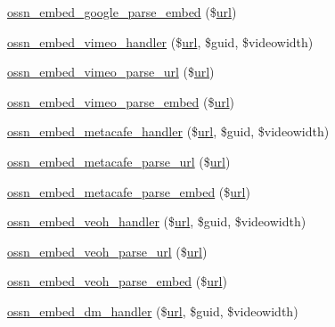 \begin{DoxyCompactItemize}
\item 
\hyperlink{ossnembed_8lib_8php_aeb01a444edbb772711eea067d8bf6939}{ossn\+\_\+embed\+\_\+google\+\_\+parse\+\_\+embed} (\$\hyperlink{ossn_8config_8site_8example_8php_ad643c3db2725019ef8130393d549e6db}{url})
\item 
\hyperlink{ossnembed_8lib_8php_aa3eb85f39f713da68aa602158e7ae611}{ossn\+\_\+embed\+\_\+vimeo\+\_\+handler} (\$\hyperlink{ossn_8config_8site_8example_8php_ad643c3db2725019ef8130393d549e6db}{url}, \$guid, \$videowidth)
\item 
\hyperlink{ossnembed_8lib_8php_a58b7d0260439c0130c7f1f0e47d8352f}{ossn\+\_\+embed\+\_\+vimeo\+\_\+parse\+\_\+url} (\$\hyperlink{ossn_8config_8site_8example_8php_ad643c3db2725019ef8130393d549e6db}{url})
\item 
\hyperlink{ossnembed_8lib_8php_a493e8e41d53bf3cfad10e16cdb5119aa}{ossn\+\_\+embed\+\_\+vimeo\+\_\+parse\+\_\+embed} (\$\hyperlink{ossn_8config_8site_8example_8php_ad643c3db2725019ef8130393d549e6db}{url})
\item 
\hyperlink{ossnembed_8lib_8php_a989f8dd3b45bd2816122693dc977fdc3}{ossn\+\_\+embed\+\_\+metacafe\+\_\+handler} (\$\hyperlink{ossn_8config_8site_8example_8php_ad643c3db2725019ef8130393d549e6db}{url}, \$guid, \$videowidth)
\item 
\hyperlink{ossnembed_8lib_8php_af2eb07a80872daa269ae0b6ff7eb1187}{ossn\+\_\+embed\+\_\+metacafe\+\_\+parse\+\_\+url} (\$\hyperlink{ossn_8config_8site_8example_8php_ad643c3db2725019ef8130393d549e6db}{url})
\item 
\hyperlink{ossnembed_8lib_8php_ab5338bb07c34b5fc693b7f73dbd5a61e}{ossn\+\_\+embed\+\_\+metacafe\+\_\+parse\+\_\+embed} (\$\hyperlink{ossn_8config_8site_8example_8php_ad643c3db2725019ef8130393d549e6db}{url})
\item 
\hyperlink{ossnembed_8lib_8php_ad2a14929285fb63afb575bce1f8139d1}{ossn\+\_\+embed\+\_\+veoh\+\_\+handler} (\$\hyperlink{ossn_8config_8site_8example_8php_ad643c3db2725019ef8130393d549e6db}{url}, \$guid, \$videowidth)
\item 
\hyperlink{ossnembed_8lib_8php_a172b3bb36e82fb10936594b86fe957b6}{ossn\+\_\+embed\+\_\+veoh\+\_\+parse\+\_\+url} (\$\hyperlink{ossn_8config_8site_8example_8php_ad643c3db2725019ef8130393d549e6db}{url})
\item 
\hyperlink{ossnembed_8lib_8php_ad1ae48c9cab7ffc339fdb2b5e6cdfd65}{ossn\+\_\+embed\+\_\+veoh\+\_\+parse\+\_\+embed} (\$\hyperlink{ossn_8config_8site_8example_8php_ad643c3db2725019ef8130393d549e6db}{url})
\item 
\hyperlink{ossnembed_8lib_8php_a24e83b1599c9d25082574364cf57beb0}{ossn\+\_\+embed\+\_\+dm\+\_\+handler} (\$\hyperlink{ossn_8config_8site_8example_8php_ad643c3db2725019ef8130393d549e6db}{url}, \$guid, \$videowidth)

\end{DoxyCompactItemize}
